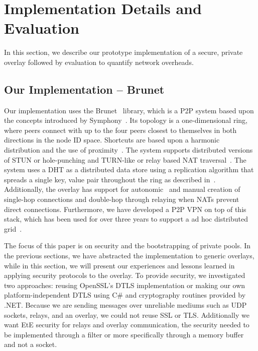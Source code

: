 \documentclass[conference]{IEEEtran}
\begin{document}
\section{Implementation Details and Evaluation}
\label{evaluations}
In this section, we describe our prototype implementation of a secure, private
overlay followed by evaluation to quantify network overheads.

\subsection{Our Implementation -- Brunet}
\label{implementation}
Our implementation uses the Brunet~\cite{brunet} library, which is a P2P system
based upon the concepts introduced by Symphony~\cite{symphony}.  Its topology is a
one-dimensional ring, where peers connect with up to the four peers closest
to themselves in both directions in the node ID space.  Shortcuts are based
upon a harmonic distribution and the use of proximity~\cite{hpdc08_0}.  The
system supports distributed versions of STUN or hole-punching and TURN-like or
relay based NAT traversal~\cite{nsdi10}.  The system uses a DHT as a distributed
data store using a replication algorithm that spreads a single key, value pair
throughout the ring as described in~\cite{pcgrid07}.  Additionally, the overlay
has support for autonomic~\cite{wow} and manual creation of single-hop
connections and double-hop through relaying when NATs prevent direct
connections.  Furthermore, we have developed a P2P VPN on top of this stack,
which has been used for over three years to support a ad hoc distributed
grid~\cite{archer, gridappliance}.

The focus of this paper is on security and the bootstrapping of private pools.
In the previous sections, we have abstracted the implementation to generic
overlays, while in this section, we will present our experiences and lessons
learned in applying security protocols to the overlay.  To provide security, we
investigated two approaches:  reusing OpenSSL's DTLS implementation or making
our own platform-independent DTLS using C\# and cryptography routines provided
by .NET.  Because we are sending messages over unreliable mediums such as UDP
sockets, relays, and an overlay, we could not reuse SSL or TLS.  Additionally
we want EtE security for relays and overlay communication, the security needed
to be implemented through a filter or more specifically through a memory buffer
and not a socket.
\end{document}
